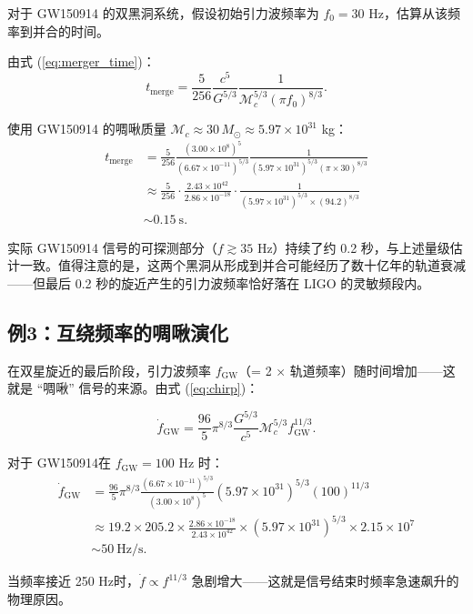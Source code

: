 对于 GW150914 的双黑洞系统，假设初始引力波频率为 $f_0 = 30$ Hz，估算从该频率到并合的时间。

由式 (\ref{eq:merger_time})：
\begin{equation}
    t_{\text{merge}} = \frac{5}{256}\frac{c^5}{G^{5/3}}\frac{1}{\mathcal{M}_c^{5/3}(\pi f_0)^{8/3}}.
\end{equation}

使用 GW150914 的啁啾质量 $\mathcal{M}_c \approx 30\,M_\odot \approx 5.97\times10^{31}$ kg：
\begin{align}
    t_{\text{merge}} &= \frac{5}{256}\frac{(3.00\times10^8)^5}{(6.67\times10^{-11})^{5/3}}\frac{1}{(5.97\times10^{31})^{5/3}(\pi \times 30)^{8/3}} \\[2pt]
    &\approx \frac{5}{256} \cdot \frac{2.43\times10^{42}}{2.86\times10^{-18}} \cdot \frac{1}{(5.97\times10^{31})^{5/3} \times (94.2)^{8/3}} \\[2pt]
    &\sim 0.15\ \text{s}.
\end{align}

实际 GW150914 信号的可探测部分（$f \gtrsim 35$ Hz）持续了约 0.2 秒，与上述量级估计一致。值得注意的是，这两个黑洞从形成到并合可能经历了数十亿年的轨道衰减——但最后 0.2 秒的旋近产生的引力波频率恰好落在 LIGO 的灵敏频段内。

\subsection{例3：互绕频率的啁啾演化}

在双星旋近的最后阶段，引力波频率 $f_{\text{GW}}$（= 2 × 轨道频率）随时间增加——这就是 ``啁啾'' 信号的来源。由式 (\ref{eq:chirp})：

\begin{equation}
    \dot{f}_{\text{GW}} = \frac{96}{5}\pi^{8/3}\frac{G^{5/3}}{c^5}\mathcal{M}_c^{5/3} f_{\text{GW}}^{11/3}.
\end{equation}

对于 GW150914在 $f_{\text{GW}} = 100$ Hz 时：
\begin{align}
    \dot{f}_{\text{GW}} &= \frac{96}{5}\pi^{8/3}\frac{(6.67\times10^{-11})^{5/3}}{(3.00\times10^8)^5}(5.97\times10^{31})^{5/3} (100)^{11/3} \\[2pt]
    &\approx 19.2 \times 205.2 \times \frac{2.86\times10^{-18}}{2.43\times10^{42}} \times (5.97\times10^{31})^{5/3} \times 2.15\times10^7 \\[2pt]
    &\sim 50\ \text{Hz/s}.
\end{align}

当频率接近 250 Hz时，$\dot{f} \propto f^{11/3}$ 急剧增大——这就是信号结束时频率急速飙升的物理原因。

